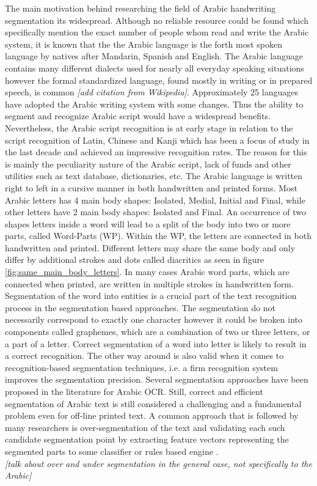 \documentclass[journal,compsoc]{IEEEtran}
\begin{document}
The main motivation behind researching the field of Arabic handwriting segmentation its widespread. Although no reliable resource could be found which specifically mention the exact number of people whom read and write the Arabic system, it is known that the the Arabic language is the forth most spoken language by natives after Mandarin, Spanish and English. The Arabic language contains many different dialects used for nearly all everyday speaking situations however the formal standardized language, found mostly in writing or in prepared speech, is common \emph{[add citation from Wikipedia]}.  Approximately 25 languages have adopted the Arabic writing system with some changes. Thus the ability to segment and recognize Arabic script would have a widespread benefits. Nevertheless, the Arabic script recognition is at early stage in relation to the script recognition of Latin, Chinese and Kanji which has been a focus of study in the last decade and achieved an impressive recognition rates. The reason for this is mainly the peculiarity nature of the Arabic script, lack of funds and other utilities such as text database, dictionaries, etc. \cite{zeki2011segmentation}
The Arabic language is written right to left in a cursive manner in both handwritten and printed forms. Most Arabic letters has 4 main body shapes: Isolated, Medial, Initial and Final, while other letters have 2 main body shapes: Isolated and Final. An occurrence of two shapes letters inside a word will lead to a split of the body into two or more parts, called Word-Parts (WP). Within the WP, the letters are connected in both handwritten and printed. Different letters may share the same body and only differ by additional strokes and dots called diacritics as seen in figure \ref{fig:same_main_body_letters}. In many cases Arabic word parts, which are connected when printed, are written in multiple strokes in handwritten form.\\  

Segmentation of the word into entities is a crucial part of the text recognition process in the segmentation based approaches. The segmentation do not necessarily correspond to exactly one character however it could be broken into components called graphemes, which are a combination of two or three letters, or a part of a letter. Correct segmentation of a word into letter is likely to result in a correct recognition. The other way around is also valid when it comes to recognition-based segmentation techniques, i.e. a firm recognition system improves the segmentation precision. Several segmentation approaches have been proposed in the literature for Arabic OCR. Still, correct and efficient segmentation of Arabic text is still considered a challenging and a fundamental problem even for off-line printed text. A common approach that is followed by many researchers is over-segmentation of the text and validating each such candidate segmentation point by extracting feature vectors representing the segmented parts to some classifier or rules based engine \cite{daifallah2009recognition}.\\
\emph{[talk about over and under segmentation in the general case, not specifically to the Arabic]}\\
\end{document}
